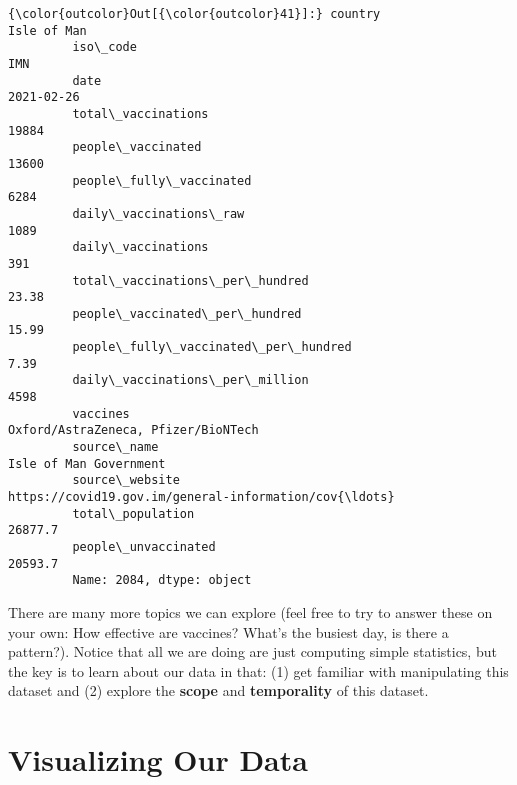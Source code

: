 \documentclass[11pt]{article}
\begin{document}
\begin{Verbatim}[commandchars=\\\{\}]
{\color{outcolor}Out[{\color{outcolor}41}]:} country                                                                      Isle of Man
         iso\_code                                                                             IMN
         date                                                                          2021-02-26
         total\_vaccinations                                                                 19884
         people\_vaccinated                                                                  13600
         people\_fully\_vaccinated                                                             6284
         daily\_vaccinations\_raw                                                              1089
         daily\_vaccinations                                                                   391
         total\_vaccinations\_per\_hundred                                                     23.38
         people\_vaccinated\_per\_hundred                                                      15.99
         people\_fully\_vaccinated\_per\_hundred                                                 7.39
         daily\_vaccinations\_per\_million                                                      4598
         vaccines                                             Oxford/AstraZeneca, Pfizer/BioNTech
         source\_name                                                       Isle of Man Government
         source\_website                         https://covid19.gov.im/general-information/cov{\ldots}
         total\_population                                                                 26877.7
         people\_unvaccinated                                                              20593.7
         Name: 2084, dtype: object
\end{Verbatim}
            
    There are many more topics we can explore (feel free to try to answer
these on your own: How effective are vaccines? What's the busiest day,
is there a pattern?). Notice that all we are doing are just computing
simple statistics, but the key is to learn about our data in that: (1)
get familiar with manipulating this dataset and (2) explore the
\textbf{scope} and \textbf{temporality} of this dataset.

    \section{Visualizing Our Data}\label{visualizing-our-data}
\end{document}

